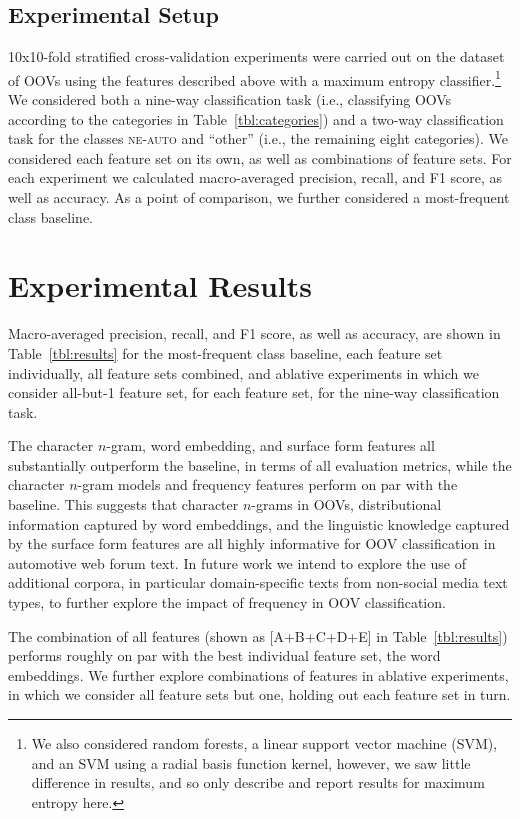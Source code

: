 \documentclass[10pt, a4paper]{article}
\newcommand{\tabref}[2][]{Table#1~\ref{#2}\xspace}
\begin{document}
\subsection{Experimental Setup}

10x10-fold stratified cross-validation experiments were carried out on
the dataset of OOVs using the features described above with a maximum
entropy classifier.\footnote{We also considered random forests, a
  linear support vector machine (SVM), and an SVM using a radial basis
  function kernel, however, we saw little difference in results, and
  so only describe and report results for maximum entropy here.} We
considered both a nine-way classification task (i.e., classifying OOVs
according to the categories in \tabref{tbl:categories}) and a two-way
classification task for the classes \textsc{ne-auto} and ``other''
(i.e., the remaining eight categories). We considered each feature set
on its own, as well as combinations of feature sets.  For each
experiment we calculated macro-averaged precision, recall, and
F1 score, as well as accuracy. As a point of comparison, we further
considered a most-frequent class baseline.

\section{Experimental Results}

Macro-averaged precision, recall, and F1 score, as well as accuracy,
are shown in \tabref{tbl:results} for the most-frequent class
baseline, each feature set individually, all feature sets combined,
and ablative experiments in which we consider all-but-1 feature set,
for each feature set, for the nine-way classification task.

The character $n$-gram, word embedding, and surface form features all
substantially outperform the baseline, in terms of all evaluation
metrics, while the character $n$-gram models and frequency features
perform on par with the baseline. This suggests that character
$n$-grams in OOVs, distributional information captured by word
embeddings, and the linguistic knowledge captured by the surface form
features are all highly informative for OOV classification in
automotive web forum text. In future work we intend to explore the use
of additional corpora, in particular domain-specific texts from
non-social media text types, to further explore the impact of
frequency in OOV classification.

The combination of all features (shown as [A+B+C+D+E] in
\tabref{tbl:results}) performs roughly on par with the best individual
feature set, the word embeddings. We further explore combinations of
features in ablative experiments, in which we consider all feature
sets but one, holding out each feature set in turn.
\end{document}
